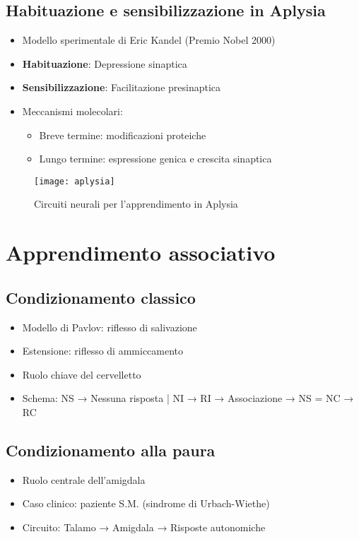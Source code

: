 \documentclass[11pt]{article}
\begin{document}
\subsection*{Habituazione e sensibilizzazione in Aplysia}
\begin{itemize}
    \item Modello sperimentale di Eric Kandel (Premio Nobel 2000)
    \item \textbf{Habituazione}: Depressione sinaptica
    \item \textbf{Sensibilizzazione}: Facilitazione presinaptica
    \item Meccanismi molecolari:
    \begin{itemize}
        \item Breve termine: modificazioni proteiche
        \item Lungo termine: espressione genica e crescita sinaptica
    \end{itemize}
\end{itemize}

\begin{figure}[h]
    \centering
    \texttt{[image: aplysia]} %
    \caption{Circuiti neurali per l'apprendimento in Aplysia}
    \label{fig:aplysia}
\end{figure}

\section*{Apprendimento associativo}

\subsection*{Condizionamento classico}
\begin{itemize}
    \item Modello di Pavlov: riflesso di salivazione
    \item Estensione: riflesso di ammiccamento
    \item Ruolo chiave del cervelletto
    \item Schema: NS → Nessuna risposta | NI → RI → Associazione → NS = NC → RC
\end{itemize}

\subsection*{Condizionamento alla paura}
\begin{itemize}
    \item Ruolo centrale dell'amigdala
    \item Caso clinico: paziente S.M. (sindrome di Urbach-Wiethe)
    \item Circuito: Talamo → Amigdala → Risposte autonomiche
\end{itemize}
\end{document}
